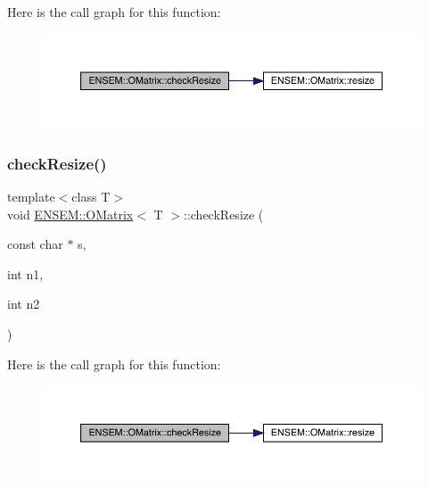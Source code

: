 Here is the call graph for this function\+:
\nopagebreak
\begin{figure}[H]
\begin{center}
\leavevmode
\includegraphics[width=350pt]{dd/d80/classENSEM_1_1OMatrix_a04fb9c7a5ca8da8a54aff3a8bafec571_cgraph}
\end{center}
\end{figure}
\mbox{\label{classENSEM_1_1OMatrix_aa9d9ff7da2027f85535b36b472ef125b}} 
\subsubsection{\texorpdfstring{checkResize()}{checkResize()}\hspace{0.1cm}{\footnotesize\ttfamily [3/6]}}
{\footnotesize\ttfamily template$<$class T$>$ \\
void \mbox{\hyperlink{classENSEM_1_1OMatrix}{E\+N\+S\+E\+M\+::\+O\+Matrix}}$<$ T $>$\+::check\+Resize (\begin{DoxyParamCaption}\item[{const char $\ast$}]{s,  }\item[{int}]{n1,  }\item[{int}]{n2 }\end{DoxyParamCaption})\hspace{0.3cm}{\ttfamily [inline]}}

Here is the call graph for this function\+:
\nopagebreak
\begin{figure}[H]
\begin{center}
\leavevmode
\includegraphics[width=350pt]{dd/d80/classENSEM_1_1OMatrix_aa9d9ff7da2027f85535b36b472ef125b_cgraph}
\end{center}
\end{figure}
\mbox{\label{classENSEM_1_1OMatrix_aa9d9ff7da2027f85535b36b472ef125b}} 
